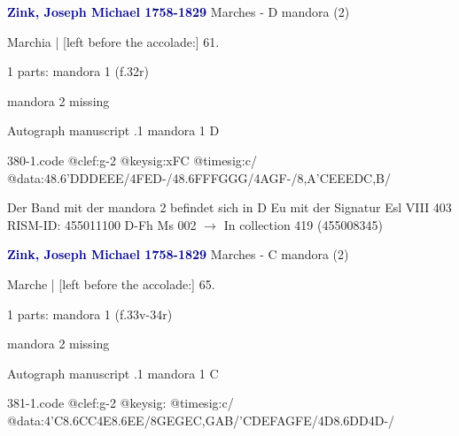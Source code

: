 \documentclass[twocolumn]{book}
\begin{document}
\newline \par \vspace{7pt} \textcolor{darkblue}{\textbf{Zink, Joseph Michael  1758-1829}}
\newline Marches - D
\newline mandora (2)
\newline \begin{itshape}[f.32r, at left:] Marchia | [left before the accolade:] 61.\end{itshape} 
\newline \textcolor{darkblue}{}  1 parts: mandora 1  (f.32r)
\newline \begin{small} mandora 2 missing\end{small} 
\newline Autograph manuscript
.1  mandora 1  D  
\begin{filecontents*}{380-1.code}
@clef:g-2
@keysig:xFC
@timesig:c/
@data:48.6'D{DD}E{EE}/4FED-/48.6F{FF}G{GG}/4AGF-/8,A'CEEEDC,B/
\end{filecontents*}
\newline
%

\newline Der Band mit der mandora 2 befindet sich in D Eu mit der Signatur Esl VIII 403
\newline RISM-ID: 455011100
\newline D-Fh  Ms 002
\newline $\rightarrow$ In collection 419 (455008345)
      
\newline \par \vspace{7pt} \textcolor{darkblue}{\textbf{Zink, Joseph Michael  1758-1829}}
\newline Marches - C
\newline mandora (2)
\newline \begin{itshape}[f.33v, at left:] Marche | [left before the accolade:] 65.\end{itshape} 
\newline \textcolor{darkblue}{}  1 parts: mandora 1  (f.33v-34r)
\newline \begin{small} mandora 2 missing\end{small} 
\newline Autograph manuscript
.1  mandora 1  C  
\begin{filecontents*}{381-1.code}
@clef:g-2
@keysig:
@timesig:c/
@data:4'C{8.6CC}4E{8.6EE}/{8GEGE}{C,GAB}/{'CDEF}{AGFE}/4D{8.6DD}4D-/
\end{filecontents*}
\newline
%
\end{document}
